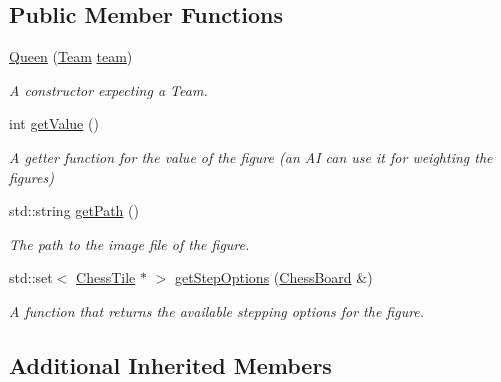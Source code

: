 \subsection*{Public Member Functions}
\begin{DoxyCompactItemize}
\item 
\mbox{\label{classQueen_aff683860a39f6b0e4c19505f8e28706f}} 
\mbox{\hyperlink{classQueen_aff683860a39f6b0e4c19505f8e28706f}{Queen}} (\mbox{\hyperlink{classChessFigure_a62f54318c1f28a08e6a6a2707f697a1d}{Team}} \mbox{\hyperlink{classChessFigure_ac7d0751a28c94d49927b9524390d1261}{team}})
\begin{DoxyCompactList}\small\item\em A constructor expecting a Team. \end{DoxyCompactList}\item 
\mbox{\label{classQueen_a88e9312353dc2443ad658de7495b86b8}} 
int \mbox{\hyperlink{classQueen_a88e9312353dc2443ad658de7495b86b8}{get\+Value}} ()
\begin{DoxyCompactList}\small\item\em A getter function for the value of the figure (an AI can use it for weighting the figures) \end{DoxyCompactList}\item 
\mbox{\label{classQueen_a0f41324a91413c415b1cf19fb52447c4}} 
std\+::string \mbox{\hyperlink{classQueen_a0f41324a91413c415b1cf19fb52447c4}{get\+Path}} ()
\begin{DoxyCompactList}\small\item\em The path to the image file of the figure. \end{DoxyCompactList}\item 
std\+::set$<$ \mbox{\hyperlink{classChessTile}{Chess\+Tile}} $\ast$ $>$ \mbox{\hyperlink{classQueen_a0fe4b1feaa74c1b2879ce991771054b0}{get\+Step\+Options}} (\mbox{\hyperlink{classChessBoard}{Chess\+Board}} \&)
\begin{DoxyCompactList}\small\item\em A function that returns the available stepping options for the figure. \end{DoxyCompactList}\end{DoxyCompactItemize}
\subsection*{Additional Inherited Members}


